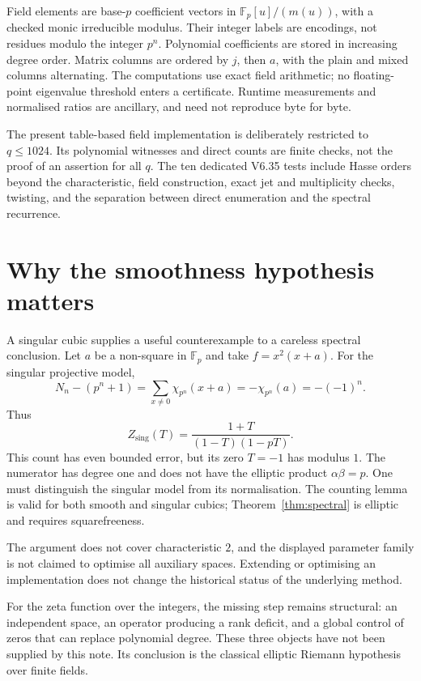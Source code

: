 \documentclass[11pt]{amsart}
\theoremstyle{definition}
\theoremstyle{remark}
\newcommand{\F}{\mathbb F}
\begin{document}
Field elements are base-$p$ coefficient vectors in $\F_p[u]/(m(u))$, with a checked monic irreducible modulus. Their integer labels are encodings, not residues modulo the integer $p^n$. Polynomial coefficients are stored in increasing degree order. Matrix columns are ordered by $j$, then $a$, with the plain and mixed columns alternating. The computations use exact field arithmetic; no floating-point eigenvalue threshold enters a certificate. Runtime measurements and normalised ratios are ancillary, and need not reproduce byte for byte.

The present table-based field implementation is deliberately restricted to $q\le1024$. Its polynomial witnesses and direct counts are finite checks, not the proof of an assertion for all $q$. The ten dedicated V6.35 tests include Hasse orders beyond the characteristic, field construction, exact jet and multiplicity checks, twisting, and the separation between direct enumeration and the spectral recurrence.

\section{Why the smoothness hypothesis matters}\label{sec:limits}

A singular cubic supplies a useful counterexample to a careless spectral conclusion. Let $a$ be a non-square in $\F_p$ and take $f=x^2(x+a)$. For the singular projective model,
\[
N_n-(p^n+1)
 =\sum_{x\ne0}\chi_{p^n}(x+a)
 =-\chi_{p^n}(a)=-(-1)^n.
\]
Thus
\[
Z_{\mathrm{sing}}(T)=
 \frac{1+T}{(1-T)(1-pT)}.
\]
This count has even bounded error, but its zero $T=-1$ has modulus $1$. The numerator has degree one and does not have the elliptic product $\alpha\beta=p$. One must distinguish the singular model from its normalisation. The counting lemma is valid for both smooth and singular cubics; Theorem~\ref{thm:spectral} is elliptic and requires squarefreeness.

The argument does not cover characteristic $2$, and the displayed parameter family is not claimed to optimise all auxiliary spaces. Extending or optimising an implementation does not change the historical status of the underlying method.

For the zeta function over the integers, the missing step remains structural: an independent space, an operator producing a rank deficit, and a global control of zeros that can replace polynomial degree. These three objects have not been supplied by this note. Its conclusion is the classical elliptic Riemann hypothesis over finite fields.
\end{document}

